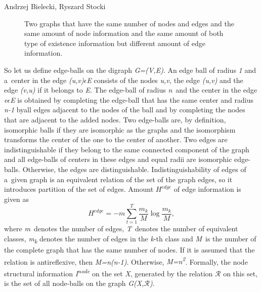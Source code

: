 \begin{artengenv2auth}{Andrzej Bielecki, Ryszard Stocki}
\begin{figure}[htbp]
 \caption{Two graphs that have the same number of nodes and edges and the same amount of node information and the same amount of both type of existence information but different amount of edge information.}
 \label{bie:fig2}
\end{figure}






So let us define edge-balls on the digraph \textit{G=(V,E)}. An edge ball of radius \textit{1} and a~center in the edge \textit{(u,v)$\epsilon $E} consists of the nodes \textit{u,v,} the edge \textit{(u,v)} and the edge \textit{(v,u)} if it belongs to \textit{E}. The edge-ball of radius \textit{n}~and the center in the edge \textit{e$\epsilon $E} is obtained by completing the edge-ball that has the same center and radius \textit{n-1} by\linebreak all edges adjacent to the nodes of the ball and by completing the nodes that are adjacent to the added nodes. Two edge-balls are, by definition, isomorphic balls if they are isomorphic as the graphs and the isomorphism transforms the center of the one to the center of another. Two edges are indistinguishable if they belong to the same connected component of the graph and all edge-balls of centers in these edges and equal radii are isomorphic edge-balls. Otherwise, the edges are distinguishable. Indistinguishability of edges of a~given graph is an equivalent relation of the set of the graph edges, so it introduces partition of the set of edges. Amount $H^{\textit{edge}}$ of edge information is given as
\begingroup
\reqnos
\begin{equation}
H^{\textit{edge}}=-m\sum _{t=1}^T\frac{m_k} M\log \frac{m_k} M,
\end{equation}
\endgroup
where \textit{m}~denotes the number of edges, \textit{T}~denotes the number of equivalent classes, \textit{m}\textit{\textsubscript{k}} denotes the number of edges in the \textit{k}{}-th class and \textit{M}~is the number of the complete graph that has the same number of nodes. If it is assumed that the relation is antireflexive, then \textit{M=n(n-1)}. Otherwise, \textit{M=n}\textit{\textsuperscript{2}}.  Formally, the node structural information \textit{I}\textit{\textsuperscript{node}} on the set \textit{X}, generated by the relation $\mathcal{R}$ on this set, is the set of all node-balls on the graph \textit{G(X,$\mathcal{R}$)}.




\end{artengenv2auth}
